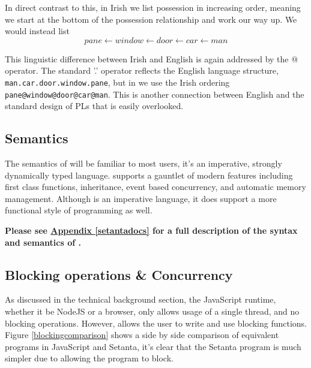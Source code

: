 In direct contrast to this, in Irish we list possession in increasing order, meaning we start at the bottom of the possession relationship and work our way up. We would instead list
\[pane \leftarrow window \leftarrow door \leftarrow car \leftarrow man\]

This linguistic difference between Irish and English is again addressed by the @ operator. The standard '.' operator reflects the English language structure, \verb|man.car.door.window.pane|, but in \Setanta{} we use the Irish ordering \verb|pane@window@door@car@man|. This is another connection between English and the standard design of PLs that is easily overlooked.

\subsection{Semantics}

The semantics of \Setanta{} will be familiar to most users, it's an imperative, strongly dynamically typed language. \Setanta{} supports a gauntlet of modern features including first class functions, inheritance, event based concurrency, and automatic memory management. Although \Setanta{} is an imperative language, it does support a more functional style of programming as well.

        \noindent\textbf{Please see \hyperref[setantadocs]{Appendix \ref*{setantadocs}} for a full description of the syntax and semantics of \Setanta{}.}

\subsection{Blocking operations \& Concurrency}

As discussed in the technical background section, the JavaScript runtime, whether it be NodeJS or a browser, only allows usage of a single thread, and no blocking operations.
However, \Setanta{} allows the user to write and use blocking functions. Figure \ref{blockingcomparison} shows a side by side comparison of equivalent programs in JavaScript and Setanta, it's clear that the Setanta program is much simpler due to allowing the program to block.

